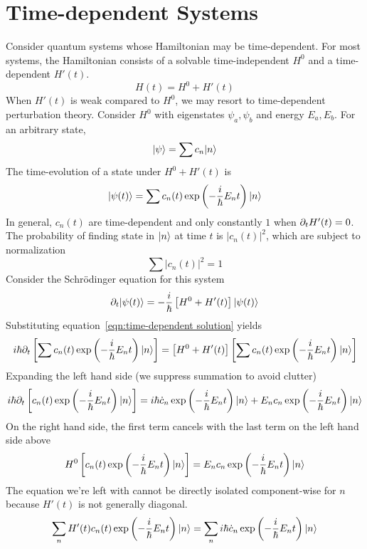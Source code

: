 \section{Time-dependent Systems}

Consider quantum systems whose Hamiltonian may be time-dependent. 
For most systems, the Hamiltonian consists of a solvable time-independent $H^0$ and 
a time-dependent $H'(t)$. 
\[ 
    H(t)=H^0+H'(t)
\] 
When $H'(t)$ is weak compared to $H^0$, we may resort to 
time-dependent perturbation theory. 
Consider $H^0$ with eigenstates $\psi_a, \psi_b$ and energy $E_a, E_b$. 
For an arbitrary state, 
\[ 
    |\psi\rangle = \sum c_n|n\rangle 
\] 
The time-evolution of a state under $H^0+H'(t)$ is 
\begin{equation}\label{eqn:time-dependent solution}
    |\psi(t)\rangle = \sum c_n(t) \exp\left(-\dfrac i {\hbar} E_n t\right) |n\rangle 
\end{equation}
In general, $c_n(t)$ are time-dependent and only constantly $1$ when $\partial_{t} H'(t) = 0$. 
The probability of finding state in $|n\rangle$ at time $t$ is $|c_n(t)|^2$, 
which are subject to normalization 
\[ 
    \sum |c_n(t)|^2 = 1
\] 
Consider the Schrödinger equation for this system 
\begin{equation}\label{eqn:time-dependent Schrodinger}
    \partial_{t} |\psi(t)\rangle = -\dfrac i {\hbar} \left[H^0+H'(t)\right] |\psi(t)\rangle
\end{equation}
Substituting equation~\ref{eqn:time-dependent solution} yields 
\[ \begin{aligned}
    i \hbar \partial_{t} \left[\sum c_n(t) \exp\left(-\dfrac i {\hbar} E_n t\right) |n\rangle \right] &= 
        \left[H^0 + H'(t)\right]\left[\sum c_n(t) \exp\left(-\dfrac i {\hbar} E_n t\right) |n\rangle \right] \\ 
\end{aligned}\] 
Expanding the left hand side (we suppress summation to avoid clutter) 
\[ 
    i \hbar \partial_{t} \left[c_n(t) \exp\left(-\dfrac i {\hbar} E_n t\right) |n\rangle \right] =
    i\hbar \dot c_n \exp\left(-\dfrac i {\hbar} E_nt\right)|n\rangle 
        + E_n c_n \exp\left(-\dfrac i {\hbar} E_nt\right)|n\rangle
\] 
On the right hand side, the first term cancels with the last term on the left hand side above 
\[ 
    H^0\left[c_n(t) \exp\left(-\dfrac i {\hbar} E_n t\right) |n\rangle \right] 
        = E_n c_n \exp\left(-\dfrac i {\hbar} E_nt\right)|n\rangle
\] 
The equation we're left with cannot be directly isolated component-wise for $n$ 
because $H'(t)$ is not generally diagonal. 
\begin{equation}
    \sum_n H'(t)c_n(t)\exp\left(-\dfrac i {\hbar} E_nt\right)|n\rangle = \sum_n i \hbar \dot c_n \exp\left(-\dfrac i {\hbar} E_nt\right)|n\rangle
\end{equation}
